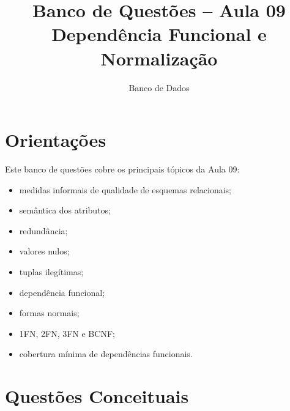 \documentclass[12pt,a4paper]{article}
\title{Banco de Questões -- Aula 09\\Dependência Funcional e Normalização}
\author{Banco de Dados}
\date{}
\begin{document}
\maketitle

\section*{Orientações}

Este banco de questões cobre os principais tópicos da Aula 09:
\begin{itemize}
    \item medidas informais de qualidade de esquemas relacionais;
    \item semântica dos atributos;
    \item redundância;
    \item valores nulos;
    \item tuplas ilegítimas;
    \item dependência funcional;
    \item formas normais;
    \item 1FN, 2FN, 3FN e BCNF;
    \item cobertura mínima de dependências funcionais.
\end{itemize}

\section{Questões Conceituais}
\end{document}
